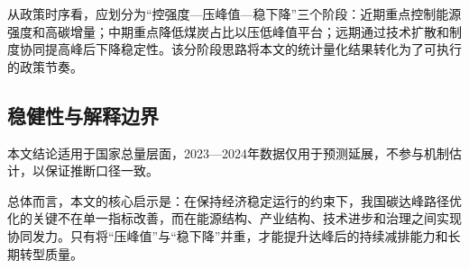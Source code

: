 从政策时序看，应划分为``控强度—压峰值—稳下降''三个阶段：近期重点控制能源强度和高碳增量；中期重点降低煤炭占比以压低峰值平台；远期通过技术扩散和制度协同提高峰后下降稳定性。该分阶段思路将本文的统计量化结果转化为了可执行的政策节奏。

\subsection{稳健性与解释边界}
本文结论适用于国家总量层面，2023—2024年数据仅用于预测延展，不参与机制估计，以保证推断口径一致。

总体而言，本文的核心启示是：在保持经济稳定运行的约束下，我国碳达峰路径优化的关键不在单一指标改善，而在能源结构、产业结构、技术进步和治理之间实现协同发力。只有将“压峰值”与“稳下降”并重，才能提升达峰后的持续减排能力和长期转型质量。

